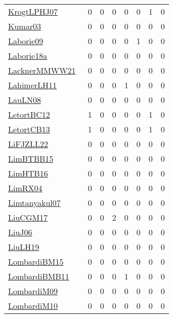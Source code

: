 {\begin{longtable}{l*{7}{r}}
\href{papers/KrogtLPHJ07.pdf}{KrogtLPHJ07}~\cite{KrogtLPHJ07} & 0 & 0 & 0 & 0 & 0 & 1 & 0\\
\href{papers/Kumar03.pdf}{Kumar03}~\cite{Kumar03} & 0 & 0 & 0 & 0 & 0 & 0 & 0\\
\href{papers/Laborie09.pdf}{Laborie09}~\cite{Laborie09} & 0 & 0 & 0 & 0 & 1 & 0 & 0\\
\href{papers/Laborie18a.pdf}{Laborie18a}~\cite{Laborie18a} & 0 & 0 & 0 & 0 & 0 & 0 & 0\\
\href{papers/LacknerMMWW21.pdf}{LacknerMMWW21}~\cite{LacknerMMWW21} & 0 & 0 & 0 & 0 & 0 & 0 & 0\\
\href{papers/LahimerLH11.pdf}{LahimerLH11}~\cite{LahimerLH11} & 0 & 0 & 0 & 1 & 0 & 0 & 0\\
\href{papers/LauLN08.pdf}{LauLN08}~\cite{LauLN08} & 0 & 0 & 0 & 0 & 0 & 0 & 0\\
\href{papers/LetortBC12.pdf}{LetortBC12}~\cite{LetortBC12} & 1 & 0 & 0 & 0 & 0 & 1 & 0\\
\href{papers/LetortCB13.pdf}{LetortCB13}~\cite{LetortCB13} & 1 & 0 & 0 & 0 & 0 & 1 & 0\\
\href{papers/LiFJZLL22.pdf}{LiFJZLL22}~\cite{LiFJZLL22} & 0 & 0 & 0 & 0 & 0 & 0 & 0\\
\href{papers/LimBTBB15.pdf}{LimBTBB15}~\cite{LimBTBB15} & 0 & 0 & 0 & 0 & 0 & 0 & 0\\
\href{papers/LimHTB16.pdf}{LimHTB16}~\cite{LimHTB16} & 0 & 0 & 0 & 0 & 0 & 0 & 0\\
\href{papers/LimRX04.pdf}{LimRX04}~\cite{LimRX04} & 0 & 0 & 0 & 0 & 0 & 0 & 0\\
\href{papers/Limtanyakul07.pdf}{Limtanyakul07}~\cite{Limtanyakul07} & 0 & 0 & 0 & 0 & 0 & 0 & 0\\
\href{papers/LiuCGM17.pdf}{LiuCGM17}~\cite{LiuCGM17} & 0 & 0 & 2 & 0 & 0 & 0 & 0\\
\href{papers/LiuJ06.pdf}{LiuJ06}~\cite{LiuJ06} & 0 & 0 & 0 & 0 & 0 & 0 & 0\\
\href{papers/LiuLH19.pdf}{LiuLH19}~\cite{LiuLH19} & 0 & 0 & 0 & 0 & 0 & 0 & 0\\
\href{papers/LombardiBM15.pdf}{LombardiBM15}~\cite{LombardiBM15} & 0 & 0 & 0 & 0 & 0 & 0 & 0\\
\href{papers/LombardiBMB11.pdf}{LombardiBMB11}~\cite{LombardiBMB11} & 0 & 0 & 0 & 1 & 0 & 0 & 0\\
\href{papers/LombardiM09.pdf}{LombardiM09}~\cite{LombardiM09} & 0 & 0 & 0 & 0 & 0 & 0 & 0\\
\href{papers/LombardiM10.pdf}{LombardiM10}~\cite{LombardiM10} & 0 & 0 & 0 & 0 & 0 & 0 & 0\\

\end{longtable}}
